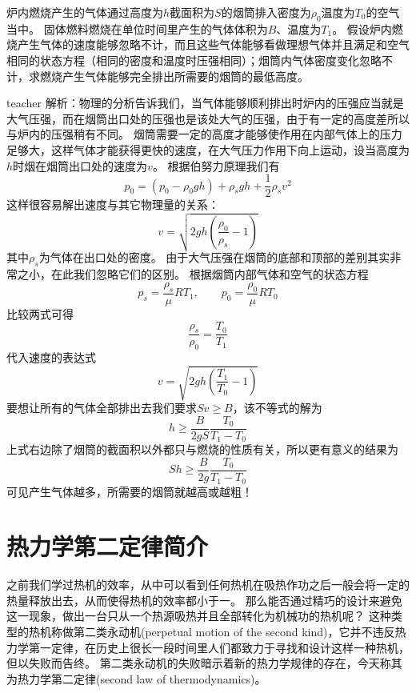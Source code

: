 \begin{example}
炉内燃烧产生的气体通过高度为$h$截面积为$S$的烟筒排入密度为$\rho_0$温度为$T_0$的空气当中。
固体燃料燃烧在单位时间里产生的气体体积为$B$、温度为$T_1$。
假设炉内燃烧产生气体的速度能够忽略不计，而且这些气体能够看做理想气体并且满足和空气相同的状态方程（相同的密度和温度时压强相同）；烟筒内气体密度变化忽略不计，求燃烧产生气体能够完全排出所需要的烟筒的最低高度。
\begin{taggedblock}{teacher}
\newline
解析：物理的分析告诉我们，当气体能够顺利排出时炉内的压强应当就是大气压强，而在烟筒出口处的压强也是该处大气的压强，由于有一定的高度差所以与炉内的压强稍有不同。
烟筒需要一定的高度才能够使作用在内部气体上的压力足够大，这样气体才能获得更快的速度，在大气压力作用下向上运动，设当高度为$h$时烟在烟筒出口处的速度为$v$。
根据伯努力原理我们有
\[
p_0=(p_0-\rho_0 gh)+\rho_s g h +\frac{1}{2}\rho_s v^2
\]
这样很容易解出速度与其它物理量的关系：
\[
v=\sqrt{2gh\left(\frac{\rho_0}{\rho_s}-1\right)}
\]
其中$\rho_s$为气体在出口处的密度。
由于大气压强在烟筒的底部和顶部的差别其实非常之小，在此我们忽略它们的区别。
根据烟筒内部气体和空气的状态方程
\[
p_s = \frac{\rho_s}{\mu}RT_1,\qquad p_0 = \frac{\rho_0}{\mu}RT_0
\]
比较两式可得
\[  \frac{\rho_s}{\rho_0}=\frac{T_0}{T_1}  \]
代入速度的表达式
\[
v=\sqrt{2gh\left(\frac{T_1}{T_0}-1\right)}
\]
要想让所有的气体全部排出去我们要求$Sv\ge B$，该不等式的解为
\[ h\ge \frac{B}{2gS}\frac{T_0}{T_1-T_0} \]
上式右边除了烟筒的截面积以外都只与燃烧的性质有关，所以更有意义的结果为
\[ S h\ge \frac{B}{2g}\frac{T_0}{T_1-T_0} \]
可见产生气体越多，所需要的烟筒就越高或越粗！
\end{taggedblock}
\end{example}





\section{热力学第二定律简介}
之前我们学过热机的效率，从中可以看到任何热机在吸热作功之后一般会将一定的热量释放出去，从而使得热机的效率都小于一。
那么能否通过精巧的设计来避免这一现象，做出一台只从一个热源吸热并且全部转化为机械功的热机呢？
这种类型的热机称做{\heiti 第二类永动机}(perpetual motion of the second kind)，它并不违反热力学第一定律，在历史上很长一段时间里人们都致力于寻找和设计这样一种热机，但以失败而告终。
第二类永动机的失败暗示着新的热力学规律的存在，今天称其为{\heiti 热力学第二定律}(second law of thermodynamics)。

